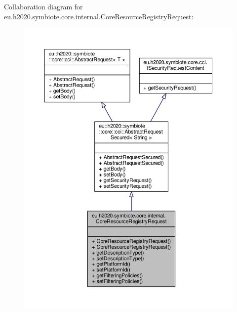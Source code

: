 Collaboration diagram for eu.\+h2020.\+symbiote.\+core.\+internal.\+Core\+Resource\+Registry\+Request\+:\nopagebreak
\begin{figure}[H]
\begin{center}
\leavevmode
\includegraphics[width=350pt]{classeu_1_1h2020_1_1symbiote_1_1core_1_1internal_1_1CoreResourceRegistryRequest__coll__graph}
\end{center}
\end{figure}

